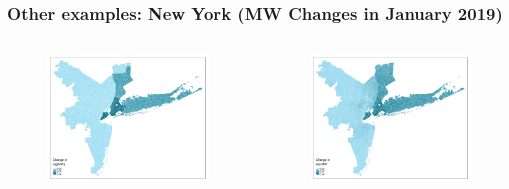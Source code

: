 \documentclass[aspectratio=169, t]{beamer}
\begin{document}
\begin{frame}[label = nyc_example]
\frametitle{Other examples: New York (MW Changes in January 2019)}
    \begin{columns}
        \begin{column}{0.50\textwidth}
            \vspace{-4mm}
            \begin{figure}
                \centering
                \includegraphics[scale = 0.36]{maps_events/output/nyc_2018-12_actual_mw.png}
            \end{figure}   
        \end{column}
        \begin{column}{0.50\textwidth}
            \vspace{-4mm}
            \begin{figure}
                \centering
                \includegraphics[scale = 0.36]{maps_events/output/nyc2018-12_exp_mw.png}
            \end{figure}   
        \end{column}
    \end{columns}
    \hyperlink{chi_example}{}
\end{frame}
\end{document}
